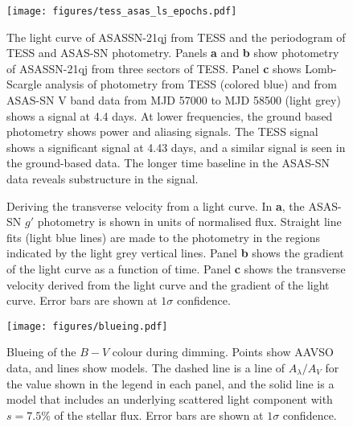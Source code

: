 \documentclass[sn-nature]{sn-jnl}%
\begin{document}
\begin{figure}
   \begin{centering}
\texttt{[image: figures/tess\_asas\_ls\_epochs.pdf]}
      \caption{The light curve of ASASSN-21qj from TESS and the periodogram of TESS and ASAS-SN photometry.
      Panels {\bf a} and {\bf b} show photometry of ASASSN-21qj from three sectors of TESS.
      Panel {\bf c} shows Lomb-Scargle analysis of photometry from TESS (colored blue) and from ASAS-SN V band data from MJD 57000 to MJD 58500 (light grey) shows a signal at 4.4 days.
      At lower frequencies, the ground based photometry shows power and aliasing signals.
      The TESS signal shows a significant signal at 4.43 days, and a similar signal is seen in the ground-based data.
      The longer time baseline in the ASAS-SN data reveals substructure in the signal.}
        \label{fig:TESS_lc}
    \end{centering}
\end{figure}

\begin{figure*}
\begin{centering}
      \caption{Deriving the transverse velocity from a light curve.
      In {\bf a}, the ASAS-SN $g'$ photometry is shown in units of normalised flux.
      Straight line fits (light blue lines) are made to the photometry in the regions indicated by the light grey vertical lines.
      Panel {\bf b} shows the gradient of the light curve as a function of time.
      Panel {\bf c} shows the transverse velocity derived from the light curve and the gradient of the light curve.
      Error bars are shown at $1\sigma$ confidence.
}
        \label{fig:gradientconvert}
\end{centering}
\end{figure*}

\begin{figure}
    \centering
\texttt{[image: figures/blueing.pdf]}
    \caption{Blueing of the $B-V$ colour during dimming.
    Points show AAVSO data, and lines show models.
    The dashed line is a line of $A_\lambda/A_V$ for the value shown in the legend in each panel, and the solid line is a model that includes an underlying scattered light component with $s=7.5$\% of the stellar flux.
    Error bars are shown at $1\sigma$ confidence.
}
    \label{fig:blueing}
\end{figure}
\end{document}
